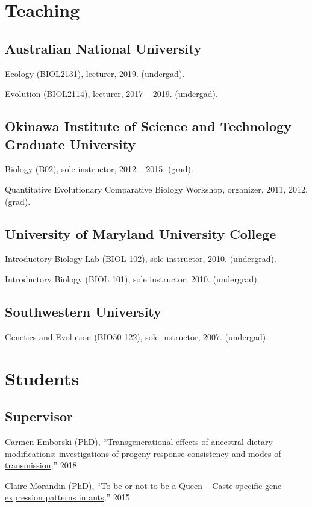 \documentclass[11pt]{article}
\begin{document}
\section{Teaching}

\subsection{Australian National University}
\ind Ecology (BIOL2131), lecturer, 2019. (undergad).

\ind Evolution (BIOL2114), lecturer, 2017 -- 2019. (undergad).

\subsection{Okinawa Institute of Science and Technology Graduate University}
\ind Biology (B02), sole instructor, 2012 -- 2015. (grad).

\ind Quantitative Evolutionary Comparative Biology Workshop, organizer, 2011, 2012. (grad).

\subsection{University of Maryland University College}
\ind Introductory Biology Lab (BIOL 102), sole instructor, 2010. (undergrad).

\ind Introductory Biology (BIOL 101), sole instructor, 2010. (undergrad).

\subsection{Southwestern University}
\ind Genetics and Evolution (BIO50-122), sole instructor, 2007. (undergad).


\section{Students}

\subsection{Supervisor}
\ind Carmen Emborski (PhD), ``\href{https://ttu-ir.tdl.org/bitstream/handle/2346/74394/EMBORSKI-DISSERTATION-2018.pdf}{Transgenerational effects of ancestral dietary modifications:
investigations of progeny response consistency and modes of transmission},'' 2018

\ind Claire Morandin (PhD), ``\href{https://pdfs.semanticscholar.org/ce84/0a0475d80c276d36c4e6f6fa7a00d0f3524c.pdf}{To be or not to be a Queen -- Caste-specific gene expression patterns in
ants},'' 2015
\end{document}
